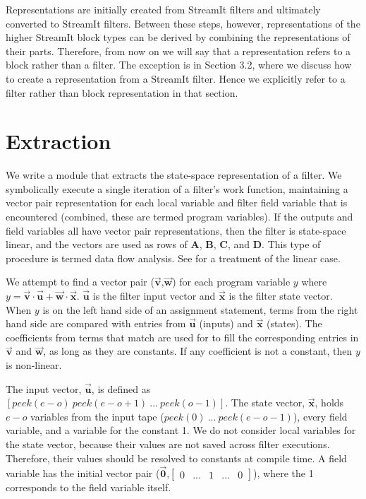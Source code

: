     Representations are initially created from StreamIt filters and
ultimately converted to StreamIt filters. Between these steps,
however, representations of the higher StreamIt block types can be
derived by combining the representations of their parts.
Therefore, from now on we will say that a representation refers to
a block rather than a filter. The exception is in Section 3.2,
where we discuss how to create a representation from a StreamIt
filter. Hence we explicitly refer to a filter rather than block
representation in that section.

\section{Extraction}

    We write a module that extracts the state-space representation of
a filter. We symbolically execute a single iteration of a filter's
work function, maintaining a vector pair representation for each
local variable and filter field variable that is encountered
(combined, these are termed program variables). If the outputs and
field variables all have vector pair representations, then the
filter is state-space linear, and the vectors are used as rows of
$\mathbf{A}$, $\mathbf{B}$, $\mathbf{C}$, and $\mathbf{D}$. This
type of procedure is termed data flow analysis. See \cite{Lamb}
for a treatment of the linear case.

    We attempt to find a vector pair
($\vec{\mathbf{v}}$,$\vec{\mathbf{w}}$) for each program variable
$y$ where $y = \vec{\mathbf{v}} \cdot \vec{\mathbf{u}} +
\vec{\mathbf{w}} \cdot \vec{\mathbf{x}}$. $\vec{\mathbf{u}}$ is
the filter input vector and $\vec{\mathbf{x}}$ is the filter state
vector. When $y$ is on the left hand side of an assignment
statement, terms from the right hand side are compared with
entries from $\vec{\mathbf{u}}$ (inputs) and $\vec{\mathbf{x}}$
(states). The coefficients from terms that match are used for to
fill the corresponding entries in $\vec{\mathbf{v}}$ and
$\vec{\mathbf{w}}$, as long as they are constants. If any
coefficient is not a constant, then $y$ is non-linear.

    The input vector, $\vec{\mathbf{u}}$, is defined as $[peek(e-o)
~peek(e-o+1) ~... ~peek(o-1)]$. The state vector,
$\vec{\mathbf{x}}$, holds $e-o$ variables from the input tape
($peek(0) ~... ~peek(e-o-1)$), every field variable, and a
variable for the constant 1. We do not consider local variables
for the state vector, because their values are not saved across
filter executions. Therefore, their values should be resolved to
constants at compile time. A field variable has the initial vector
pair ($\vec{\mathbf{0}}$,$\left [
\begin{array} {ccccc} 0 & ... & 1 & ... & 0 \end{array} \right
]$), where the 1 corresponds to the field variable itself.

